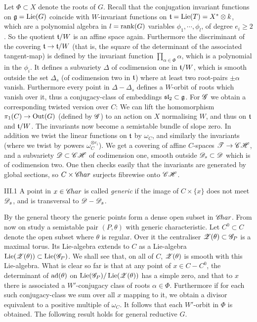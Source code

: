 \documentclass[12pt,english]{smfart}
\theoremstyle{plain} \newtheorem{innerthm}{Theorem} \newtheorem{innerlem}{Lemma} \newtheorem{innerprop}{Proposition} \newtheorem{innercor}{Corollary} \theoremstyle{definition} \newtheorem{innerdefn}{Definition} \newtheorem{innerconstr}{Construction} \theoremstyle{remark} \newtheorem*{remark}{Remark} \newtheorem*{remarks}{Remarks} \newtheorem*{applications}{Applications}
\begin{document}
Let $\Phi\subset X$ denote the roots of $G$. Recall that the conjugation invariant functions on $\mathfrak{g}=\operatorname{Lie}(G)$ coincide with $W$-invariant functions on $\mathfrak{t}=\operatorname{Lie}(T)=X^*\otimes k$, which are a polynomial algebra in $l=\operatorname{rank}(G)$ variables $\phi_1,\cdots,\phi_l$, of degree $e_i\ge 2$. So the quotient $\mathfrak{t}/W$ is an affine space again. Furthermore the discriminant of the covering $\mathfrak{t}\to\mathfrak{t}/W$ (that is, the square of the determinant of the associated tangent-map) is defined by the invariant function $\prod_{\alpha\in\Phi}\alpha$, which is a polynomial in the $\phi_i$. It defines a subvariety $\Delta$ of codimension one in $\mathfrak{t}/W$, which is smooth outside the
set $\Delta_s$ (of codimension two in $\mathfrak{t}$) where at least two root-pairs $\pm\alpha$ vanish. Furthermore every point in $\Delta-\Delta_s$ defines a $W$-orbit of roots which vanish over it, thus a conjugacy-class of embeddings $\mathfrak{sl}_2\subset\mathfrak{g}$. For $\mathscr{G}$ we obtain a corresponding twisted version over $C$: We can lift the homomorphism $\pi_1(C)\to\operatorname{Out}(G)$ (defined by $\mathscr{G}$) to an action on $X$ normalising $W$, and thus on $\mathfrak{t}$ and $\mathfrak{t}/W$. The invariants now become a semistable bundle of slope zero. In addition we twist the linear functions on $\mathfrak{t}$ by $\omega_C$, and similarly the invariants (where we twist by powers $\omega_C^{\otimes e_i}$). We get a covering of affine $C$-spaces $\mathscr{T}\to\mathscr{C}\mathscr{H}$, and a subvariety $\mathscr{D}\subset\mathscr{C}\mathscr{H}$ of codimension one, smooth outside $\mathscr{D}_s\subset\mathscr{D}$ which is of codimension two. One then checks easily that the invariants are generated by global sections, so $C\times\mathscr{C}\!har$ surjects fibrewise onto $\mathscr{C}\mathscr{H}$.

\begin{definition}{III.1}\label{def:III.1}
A point in $x\in\mathscr{C}\!har$ is called \emph{generic} if the image of $C\times\{x\}$ does not meet $\mathscr{D}_s$, and is transversal to $\mathscr{D}-\mathscr{D}_s$.
\end{definition}

By the general theory the generic points form a dense open subset in $\mathscr{C}\!har$. From now on study a semistable pair $(P,\theta)$ with generic characteristic. Let $C^0\subset C$ denote the open subset where $\theta$ is regular. Over it the centraliser $\mathscr{Z}(\theta)\subset\mathscr{G}_P$ is a maximal torus. Its Lie-algebra extends to $C$ as a Lie-algebra $\operatorname{Lie}(\mathscr{Z}(\theta))\subset\operatorname{Lie}(\mathscr{G}_P)$. We shall see that, on all of $C$, $\mathscr{Z}(\theta)$ is smooth with this Lie-algebra. What is clear so far is that at any point of $x\in C-C^0$, the determinant of $\operatorname{ad}(\theta)$ on $\operatorname{Lie}(\mathscr{G}_P)/\operatorname{Lie}(\mathscr{Z}(\theta))$ has a simple zero, and that to $x$ there is associated a $W'$-conjugacy class of roots $\alpha\in\Phi$. Furthermore if for each such conjugacy-class we sum over all $x$ mapping to it, we obtain a divisor equivalent to a positive multiple of $\omega_C$. It follows that each $W'$-orbit in $\Phi$ is obtained. The following result holds for general reductive $G$.
\end{document}
